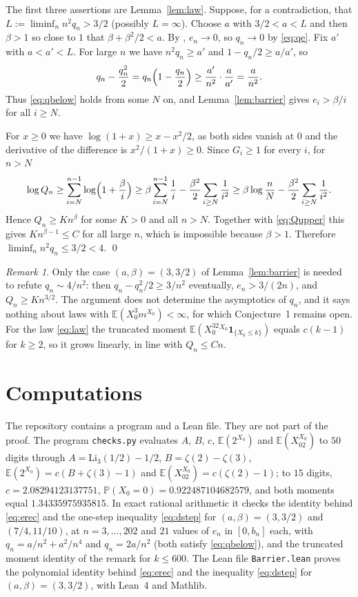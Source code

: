\documentclass[11pt]{amsart}
\theoremstyle{definition}
\theoremstyle{remark}
\newtheorem{remark}[theorem]{Remark}
\numberwithin{equation}{section}
\newcommand{\Pp}{\mathbb P}
\newcommand{\E}{\mathbb E}
\begin{document}
The first three assertions are Lemma~\ref{lem:law}. Suppose, for a contradiction, that $L:=\liminf_n n^2q_n>3/2$ (possibly $L=\infty$). Choose $a$ with $3/2<a<L$ and then $\beta>1$ so close to $1$ that $\beta+\beta^2/2<a$. By \cite[Theorem~2]{CDHLS}, $e_n\to0$, so $q_n\to0$ by \eqref{eq:qe}. Fix $a'$ with $a<a'<L$. For large $n$ we have $n^2q_n\ge a'$ and $1-q_n/2\ge a/a'$, so
\[
q_n-\frac{q_n^2}{2}=q_n\Bigl(1-\frac{q_n}{2}\Bigr)\ge\frac{a'}{n^2}\cdot\frac{a}{a'}=\frac{a}{n^2}.
\]
Thus \eqref{eq:qbelow} holds from some $N$ on, and Lemma~\ref{lem:barrier} gives $e_i>\beta/i$ for all $i\ge N$.

For $x\ge0$ we have $\log(1+x)\ge x-x^2/2$, as both sides vanish at $0$ and the derivative of the difference is $x^2/(1+x)\ge0$. Since $G_i\ge1$ for every $i$, for $n>N$
\[
\log Q_n\ge\sum_{i=N}^{n-1}\log\Bigl(1+\frac\beta i\Bigr)\ge\beta\sum_{i=N}^{n-1}\frac1i-\frac{\beta^2}{2}\sum_{i\ge N}\frac1{i^2}\ge\beta\log\frac nN-\frac{\beta^2}{2}\sum_{i\ge N}\frac1{i^2}.
\]
Hence $Q_n\ge Kn^\beta$ for some $K>0$ and all $n>N$. Together with \eqref{eq:Qupper} this gives $Kn^{\beta-1}\le C$ for all large $n$, which is impossible because $\beta>1$. Therefore $\liminf_nn^2q_n\le3/2<4$. \qed

\begin{remark}
Only the case $(a,\beta)=(3,3/2)$ of Lemma~\ref{lem:barrier} is needed to refute $q_n\sim4/n^2$: then $q_n-q_n^2/2\ge3/n^2$ eventually, $e_n>3/(2n)$, and $Q_n\ge Kn^{3/2}$. The argument does not determine the asymptotics of $q_n$, and it says nothing about laws with $\E(X_0^3m^{X_0})<\infty$, for which Conjecture~1 remains open. For the law \eqref{eq:law} the truncated moment $\E(X_0^32^{X_0}\mathbf 1_{\{X_0\le k\}})$ equals $c(k-1)$ for $k\ge2$, so it grows linearly, in line with $Q_n\le Cn$.
\end{remark}

\section{Computations}\label{sec:numerics}

The repository \cite{code} contains a program and a Lean file. They are not part of the proof. The program \texttt{checks.py} evaluates $A$, $B$, $c$, $\E(2^{X_0})$ and $\E(X_02^{X_0})$ to $50$ digits through $A=\mathrm{Li}_3(1/2)-1/2$, $B=\zeta(2)-\zeta(3)$, $\E(2^{X_0})=c(B+\zeta(3)-1)$ and $\E(X_02^{X_0})=c(\zeta(2)-1)$; to $15$ digits, $c=2.08294123137751$, $\Pp(X_0=0)=0.922487104682579$, and both moments equal $1.34335975935815$. In exact rational arithmetic it checks the identity behind \eqref{eq:erec} and the one-step inequality \eqref{eq:dstep} for $(a,\beta)=(3,3/2)$ and $(7/4,11/10)$, at $n=3,\dots,202$ and $21$ values of $e_n$ in $[0,b_n]$ each, with $q_n=a/n^2+a^2/n^4$ and $q_n=2a/n^2$ (both satisfy \eqref{eq:qbelow}), and the truncated moment identity of the remark for $k\le600$. The Lean file \texttt{Barrier.lean} proves the polynomial identity behind \eqref{eq:erec} and the inequality \eqref{eq:dstep} for $(a,\beta)=(3,3/2)$, with Lean~4 and Mathlib.
\end{document}
